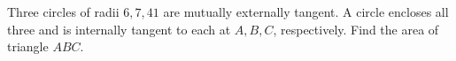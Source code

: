 Three circles of radii $6,7,41$ are mutually externally tangent. A circle encloses all three and is internally tangent to each at $A,B,C$, respectively. Find the area of triangle $ABC$.
